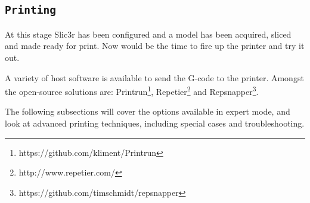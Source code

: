 
\subsection{\texttt{Printing}} %
\label{sec:printing}

At this stage Slic3r has been configured and a model has been acquired, sliced and made ready for print.  Now would be the time to fire up the printer and try it out.

A variety of host software is available to send the G-code to the printer.  Amongst the open-source solutions are: Printrun\footnote{https://github.com/kliment/Printrun}, Repetier\footnote{http://www.repetier.com/} and Repsnapper\footnote{https://github.com/timschmidt/repsnapper}.

The following subsections will cover the options available in expert mode, and look at advanced printing techniques, including special cases and troubleshooting.

